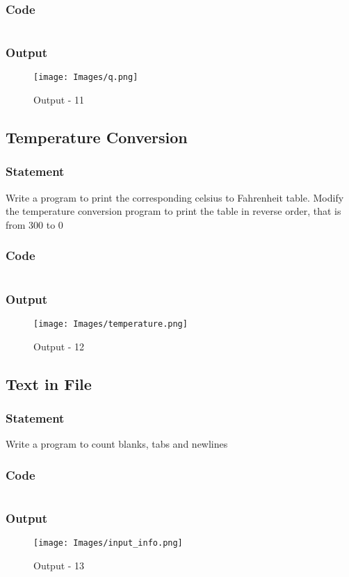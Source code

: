 \subsubsection{Code}
\inputminted[]{c}{./code/q.cpp}
\pagebreak
\subsubsection{Output}
\begin{figure}[!htb]
  \centering
  \texttt{[image: Images/q.png]}
  \label{Output-11}
  \caption{Output - 11}
\end{figure}


\pagebreak
\subsection{Temperature Conversion}
\subsubsection{Statement}
Write a program to print the corresponding celsius to Fahrenheit table. Modify the
temperature conversion program to print the table in reverse order, that is from 300 to 0
\subsubsection{Code}
\inputminted[]{c}{'./code/temperature.cpp'}
\subsubsection{Output}
\begin{figure}[!htb]
  \centering
  \texttt{[image: Images/temperature.png]}
  \label{Output-12}
  \caption{Output - 12}
\end{figure}


\pagebreak
\subsection{Text in File}
\subsubsection{Statement}
Write a program to count blanks, tabs and newlines
\subsubsection{Code}
\inputminted[]{c}{./code/input_info.cpp}
\subsubsection{Output}
\begin{figure}[!htb]
  \centering
  \texttt{[image: Images/input\_info.png]}
  \label{Output-13}
  \caption{Output - 13}
\end{figure}


